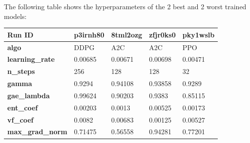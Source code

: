 \documentclass[../xlapes02]{subfiles}
\begin{document}
    The following table shows the hyperparameters of the 2 best and 2 worst trained models:
    \begin{table}[!ht]
        \centering
        \label{tab:best-worst-hyperparameters}
        \begin{tabular}{|l||l|l||l|l|}
            \hline
            \textbf{Run ID}                    & p3irnh80                                     & 8tml2ozg                                     & zfjr0ks0                                     & pky1wslb                                     \\ \hline
            \textbf{algo}                      & DDPG                                         & A2C                                          & A2C                                          & PPO                                          \\ \hline
            \textbf{learning\_rate}            & 0.00685                                      & 0.00671                                      & 0.00698                                      & 0.00471                                      \\ \hline
            \textbf{n\_steps}                  & 256                                          & 128                                          & 128                                          & 32                                           \\ \hline
            \textbf{gamma}                     & 0.9294                                       & 0.94108                                      & 0.93858                                      & 0.9289                                       \\ \hline
            \textbf{gae\_lambda}               & 0.99624                                      & 0.90203                                      & 0.9383                                       & 0.85115                                      \\ \hline
            \textbf{ent\_coef}                 & 0.00203                                      & 0.0013                                       & 0.00525                                      & 0.00173                                      \\ \hline
            \textbf{vf\_coef}                  & 0.0082                                       & 0.00683                                      & 0.00125                                      & 0.00527                                      \\ \hline
            \textbf{max\_grad\_norm}           & 0.71475                                      & 0.56558                                      & 0.94281                                      & 0.77201                                      \\ \hline

\end{tabular}
\end{table}
\end{document}
